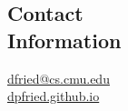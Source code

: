 \documentclass[11pt,resmargin,line]{resume}
\newcommand{\mailto}[1]{
  \href{mailto:#1}{#1}
}
\begin{document}
\begin{resume}

\section{Contact\\Information}
\mailto{dfried@cs.cmu.edu} \\
{\small \url{dpfried.github.io}}



\end{resume}
\end{document}
